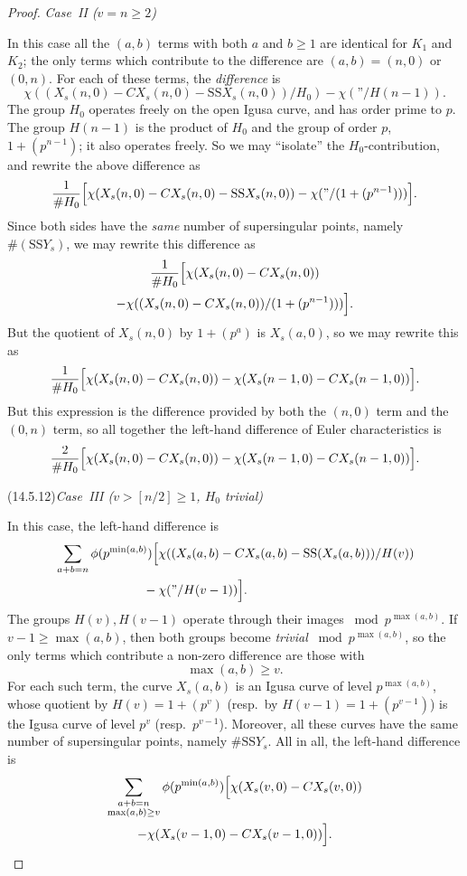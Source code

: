\begin{proof}
\kmitem\label{item:14.5.12} \emph{Case~II ($v = n \ge 2$)}

In this case all the $(a,b)$ terms with both $a$ and $b \ge 1$ are identical for $K_1$ and $K_2$; the only terms which contribute to the difference are $(a,b) = (n,0)$ or $(0,n)$. For each of these terms, the \emph{difference} is
\[
\chi((X_s(n,0) - CX_s(n,0) - \mathrm{SS} X_s(n,0))/H_0) - \chi(\text{''}/H(n-1)) .
\]
The group $H_0$ operates freely on the open Igusa curve, and has order prime to $p$. The group $H(n-1)$ is the product of $H_0$ and the group of order $p$, $1+(p^{n-1})$; it also operates freely. So we may ``isolate'' the $H_0$-contribution, and rewrite the above difference as
\[
\frac{1}{\# H_0} \Bigl[ \chi(X_s(n,0) - CX_s(n,0) - \mathrm{SS} X_s(n,0)) - \chi(\text{''} / (1+(p^{n-1}))) \Bigr] .
\]
Since both sides have the \emph{same} number of supersingular points, namely $\#(\mathrm{SS} Y_s)$, we may rewrite this difference as
\begin{multline*}
\frac{1}{\# H_0} \Bigl[ \chi(X_s(n,0) - CX_s(n,0)) \\
- \chi((X_s(n,0) - CX_s(n,0))/(1+(p^{n-1}))) \Bigr] .
\end{multline*}
But the quotient of $X_s(n,0)$ by $1+(p^a)$ is $X_s(a,0)$, so we may rewrite this as
\[
\frac{1}{\# H_0} \Bigl[ \chi(X_s(n,0) - CX_s(n,0)) - \chi(X_s(n-1,0) - CX_s(n-1,0)) \Bigr] .
\]
But this expression is the difference provided by both the $(n,0)$ term and the $(0,n)$ term, so all together the left-hand difference of Euler characteristics is
\[
\frac{2}{\# H_0} \Bigl[ \chi(X_s(n,0) - CX_s(n,0)) - \chi(X_s(n-1,0) - CX_s(n-1,0)) \Bigr] .
\]

\par{}\noindent{}\label{item:14.5.12b}(14.5.12)\enspace\emph{Case~III ($v > [n/2] \ge 1$, $H_0$ trivial)}

In this case, the left-hand difference is
\begin{align*}
&\sum_{a+b=n} \phi(p^{\min(a,b)}) \Bigl[ \chi((X_s(a,b) - CX_s(a,b) - \mathrm{SS}(X_s(a,b)))/H(v)) \\
&\qquad\qquad\qquad\quad - \chi(\text{''} / H(v-1)) \Bigr] .
\end{align*}
The groups $H(v), H(v-1)$ operate through their images $\bmod p^{\max(a,b)}$. If $v-1 \ge \max(a,b)$, then both groups become \emph{trivial} $\bmod p^{\max(a,b)}$, so the only terms which contribute a non-zero difference are those with
\[
\max(a,b) \ge v .
\]
For each such term, the curve $X_s(a,b)$ is an Igusa curve of level $p^{\max(a,b)}$, whose quotient by $H(v) = 1+(p^v)$ (resp.~by $H(v-1) = 1+(p^{v-1})$) is the Igusa curve of level $p^v$ (resp.~$p^{v-1}$). Moreover, all these curves have the same number of supersingular points, namely $\#\mathrm{SS} Y_s$. All in all, the left-hand difference is
\begin{multline*}
\sum_{\substack{a+b=n \\ \max(a,b) \ge v}} \phi(p^{\min(a,b)}) \Bigl[ \chi(X_s(v,0) - CX_s(v,0)) \\
- \chi(X_s(v-1,0) - CX_s(v-1,0)) \Bigr] .
\end{multline*}


\end{proof}
